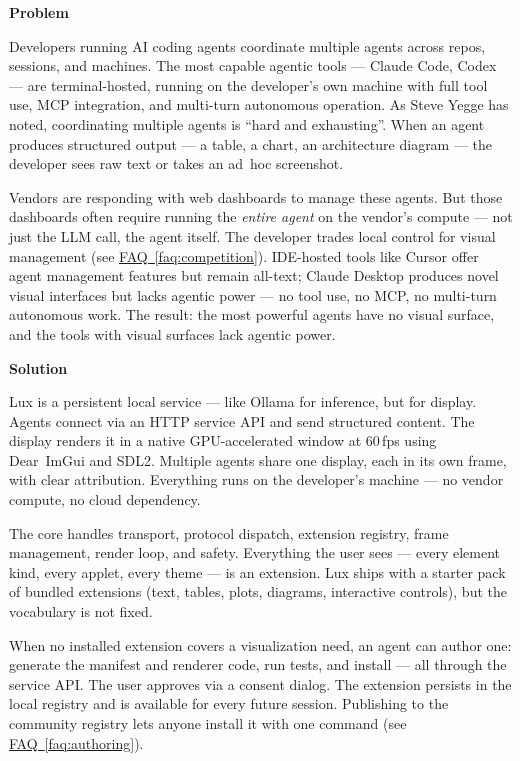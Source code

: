 \documentclass[11pt,letterpaper]{article}
\newcommand{\prsection}[1]{%
  \vspace{1em}%
  {\large\bfseries\color{SectionBlue}#1}%
  \vspace{0.3em}\par%
}
\newcommand{\faqref}[1]{\hyperref[#1]{FAQ~\ref*{#1}}}
\begin{document}
\prsection{Problem}

Developers running AI coding agents coordinate multiple agents across repos,
sessions, and machines.  The most capable agentic tools --- Claude
Code\cite{anthropic2025claudecode}, Codex --- are terminal-hosted, running on
the developer's own machine with full tool use, MCP integration, and
multi-turn autonomous operation.  As Steve Yegge has noted, coordinating
multiple agents is ``hard and exhausting''\cite{yegge2025agents}.  When an
agent produces structured output --- a table, a chart, an architecture
diagram --- the developer sees raw text or takes an ad~hoc screenshot.

Vendors are responding with web dashboards to manage these agents.  But those
dashboards often require running the \emph{entire agent} on the vendor's
compute --- not just the LLM call, the agent itself.  The developer trades
local control for visual management (see \faqref{faq:competition}).
IDE-hosted tools like Cursor offer agent management features but remain
all-text; Claude Desktop produces novel visual interfaces but lacks agentic
power --- no tool use, no MCP, no multi-turn autonomous work.  The result:
the most powerful agents have no visual surface, and the tools with visual
surfaces lack agentic power.

\prsection{Solution}

Lux is a persistent local service --- like Ollama\cite{ollama2025} for
inference, but for display.  Agents connect via an HTTP service API and send
structured content.  The display renders it in a native GPU-accelerated
window at 60\,fps using Dear~ImGui\cite{imgui2025} and SDL2.  Multiple
agents share one display, each in its own frame, with clear attribution.
Everything runs on the developer's machine --- no vendor compute, no cloud
dependency.

The core handles transport, protocol dispatch, extension registry, frame
management, render loop, and safety.  Everything the user sees ---
every element kind, every applet, every theme --- is an extension.  Lux ships
with a starter pack of bundled extensions (text, tables, plots, diagrams,
interactive controls), but the vocabulary is not fixed.

When no installed extension covers a visualization need, an agent can author
one: generate the manifest and renderer code, run tests, and install ---
all through the service API.  The user approves via a consent dialog.
The extension persists in the local registry and is available for every
future session.  Publishing to the community registry lets anyone install it
with one command (see \faqref{faq:authoring}).
\end{document}

